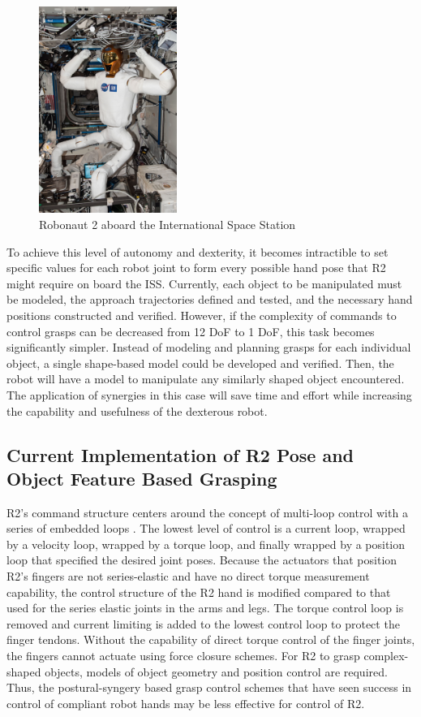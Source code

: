 \documentclass[runningheads,a4paper]{llncs}
\begin{document}
  \begin{figure}[t]
   \centering
   \includegraphics[width=0.4\textwidth]{r2_iss}
   \caption{Robonaut 2 aboard the International Space Station}
   \label{at_r2_iss}
  \end{figure}

To achieve this level of autonomy and dexterity, it becomes intractible to set specific values for each robot joint to form every possible hand pose that R2 might require on board the ISS. Currently, each object to be manipulated must be modeled, the approach trajectories defined and tested, and the necessary hand positions constructed and verified. However, if the complexity of commands to control grasps can be decreased from 12 DoF to 1 DoF, this task becomes significantly simpler. Instead of modeling and planning grasps for each individual object, a single shape-based model could be developed and verified. Then, the robot will have a model to manipulate any similarly shaped object encountered. The application of synergies in this case will save time and effort while increasing the capability and usefulness of the dexterous robot.  


\subsection{Current Implementation of R2 Pose and Object Feature Based Grasping}
R2's command structure centers around the concept of multi-loop control with a series of embedded loops \cite{r2_control}. The lowest level of control is a current loop, wrapped by a velocity loop, wrapped by a torque loop, and finally wrapped by a position loop that specified the desired joint poses. 
Because the actuators that position R2's fingers are not series-elastic and have no direct torque measurement capability, the control structure of the R2 hand is modified compared to that used for the series elastic joints in the arms and legs. The torque control loop is removed and current limiting is added to the lowest control loop to protect the finger tendons. Without the capability of direct torque control of the finger joints, the fingers cannot actuate using force closure schemes. For R2 to grasp complex-shaped objects, models of object geometry and position control are required. Thus, the postural-syngery based grasp control schemes that have seen success in control of compliant robot hands \cite{softhand} may be less effective for control of R2. 
\end{document}
